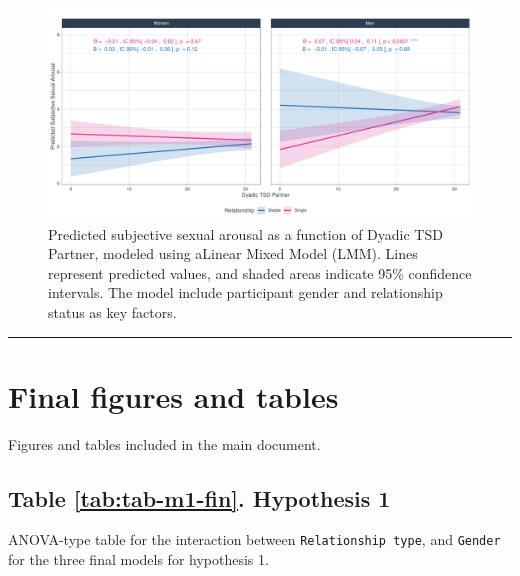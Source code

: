 \documentclass[
  bookmarksnumbered]{article}
\begin{document}
\begin{figure}
\centering
\includegraphics{Sexual_Desire_Arousal_anonymous_files/figure-latex/fig-h3c-1.pdf}
\caption{\label{fig:fig-h3c}Predicted subjective sexual arousal as a function of Dyadic TSD Partner, modeled using aLinear Mixed Model (LMM). Lines represent predicted values, and shaded areas indicate 95\% confidence intervals. The model include participant gender and relationship status as key factors.}
\end{figure}

\begin{center}\rule{0.5\linewidth}{0.5pt}\end{center}

\closesupplement

\section{Final figures and tables}\label{final-figures-and-tables}

Figures and tables included in the main document.

\subsection{Table \ref{tab:tab-m1-fin}. Hypothesis 1}\label{table-reftabtab-m1-fin.-hypothesis-1}

ANOVA-type table for the interaction between \texttt{Relationship\ type}, and \texttt{Gender} for the three final models for hypothesis 1.
\end{document}

